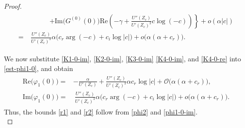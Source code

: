 \documentclass[10pt,a4paper]{amsart}
\begin{document}
\begin{proof}
\begin{align}
\begin{aligned}
					&\qquad\quad \left.+\text{Im}\big(G^{(0)}(0)\big) \text{Re}\left(-\gamma+\frac{U''(Z_c)}{U'(Z_c)^2}c\log(-c)\right)\right\}+o(\alpha|c|)\\
					=&~\frac{U''(Z_c)}{U'(Z_c)^3} \alpha\big(c_r\arg(-c)+c_i\log|c|\big)+o\big(\alpha (\alpha+c_r)\big).
			\end{aligned}\end{align}
		
	We now substitute \eqref{K1-0-im}, \eqref{K2-0-im}, \eqref{K3-0-im} \eqref{K4-0-im}, and \eqref{K4-0-re} into \eqref{est-phi1-0}, and obtain
			\begin{align}\label{phi1-0-im}\begin{aligned}
					\text{Re}\big(\varphi_1(0)\big) =& -\frac{\alpha}{U'(Z_c)}+\frac{U''(Z_c)}{U'(Z_c)^3} \alpha c_r\log|c|+\mathcal{O}\big(\alpha (\alpha+c_r)\big),\\
					\text{Im}\big(\varphi_1(0)\big) =&~ \frac{U''(Z_c)}{U'(Z_c)^3} \alpha\big(c_r\arg(-c)+c_i\log|c|\big)+o\big(\alpha (\alpha+c_r)\big).
			\end{aligned}\end{align}
		Thus, the bounds \eqref{r1} and \eqref{r2} follow from \eqref{phi2} and \eqref{phi1-0-im}.\\
		

\end{proof}
\end{document}
